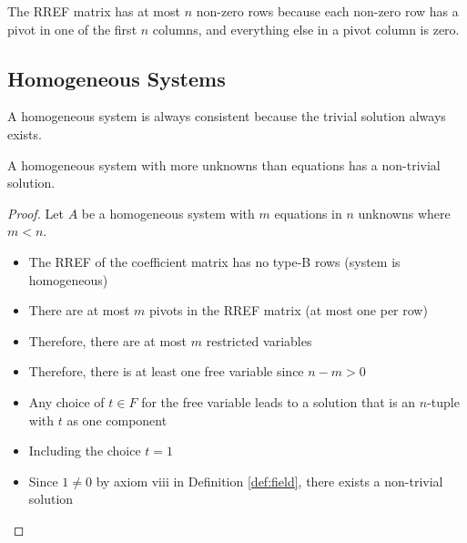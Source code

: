 \begin{note}
    The RREF matrix has at most $n$ non-zero rows because each non-zero row has a pivot in one of the first $n$ columns, and everything else in a pivot column is zero.
\end{note}

\subsection{Homogeneous Systems}

\begin{note}
    A homogeneous system is always consistent because the trivial solution always exists.
\end{note}

\begin{theorem}\label{thm:nontrivial-solutions}
    A homogeneous system with more unknowns than equations has a non-trivial solution.
\end{theorem}

\begin{proof}
    Let $A$ be a homogeneous system with $m$ equations in $n$ unknowns where $m < n$.
    \begin{itemize}
        \item The RREF of the coefficient matrix has no type-B rows (system is homogeneous)
        \item There are at most $m$ pivots in the RREF matrix (at most one per row)
        \item Therefore, there are at most $m$ restricted variables
        \item Therefore, there is at least one free variable since $n - m > 0$
        \item Any choice of $t \in F$ for the free variable leads to a solution that is an $n$-tuple with $t$ as one component
        \item Including the choice $t = 1$
        \item Since $1 \neq 0$ by axiom viii in Definition \ref{def:field}, there exists a non-trivial solution
    \end{itemize}
\end{proof}